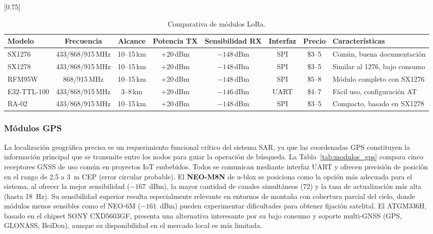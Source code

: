 \begin{table}[H]
\begin{center}
\caption{Comparativa de módulos LoRa.}
\scalebox{0.75}[0.75]{
\begin{tabular}{| l | c | c | c | c | c | c | l |}
\hline
 \textbf{Modelo} & \textbf{Frecuencia} & \textbf{Alcance} & \textbf{Potencia TX} & \textbf{Sensibilidad RX} & \textbf{Interfaz} & \textbf{Precio} & \textbf{Características} \\
\hline
\hline
 SX1276 & 433/868/915\,MHz & 10--15\,km & +20\,dBm & $-148$\,dBm & SPI & \$3--5 & Común, buena documentación \\
 SX1278 & 433/868/915\,MHz & 10--15\,km & +20\,dBm & $-148$\,dBm & SPI & \$3--5 & Similar al 1276, bajo consumo \\
 RFM95W & 868/915\,MHz & 10--15\,km & +20\,dBm & $-148$\,dBm & SPI & \$5--8 & Módulo completo con SX1276 \\
 E32-TTL-100 & 433/868/915\,MHz & 3--8\,km & +20\,dBm & $-146$\,dBm & UART & \$4--7 & Fácil uso, configuración AT \\
 RA-02 & 433/868/915\,MHz & 10--15\,km & +20\,dBm & $-148$\,dBm & SPI & \$3--5 & Compacto, basado en SX1278 \\
\hline
\end{tabular}}
\label{tab:modulos_lora}
\end{center}
\end{table}

\subsubsection{Módulos GPS}

La localización geográfica precisa es un requerimiento funcional crítico del sistema SAR, ya que las coordenadas GPS constituyen la información principal que se transmite entre los nodos para guiar la operación de búsqueda. La Tabla~\ref{tab:modulos_gps} compara cinco receptores GNSS de uso común en proyectos IoT embebidos. Todos se comunican mediante interfaz UART y ofrecen precisión de posición en el rango de 2,5 a 3~m CEP (error circular probable). El \textbf{NEO-M8N} de u-blox se posiciona como la opción más adecuada para el sistema, al ofrecer la mejor sensibilidad ($-167$~dBm), la mayor cantidad de canales simultáneos (72) y la tasa de actualización más alta (hasta 18~Hz). Su sensibilidad superior resulta especialmente relevante en entornos de montaña con cobertura parcial del cielo, donde módulos menos sensibles como el NEO-6M ($-161$~dBm) pueden experimentar dificultades para obtener fijación satelital. El ATGM336H, basado en el chipset SONY CXD5603GF, presenta una alternativa interesante por su bajo consumo y soporte multi-GNSS (GPS, GLONASS, BeiDou), aunque su disponibilidad en el mercado local es más limitada.

